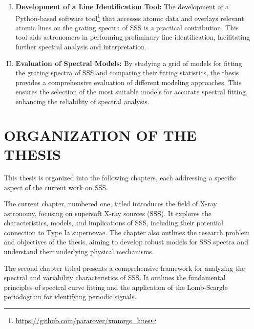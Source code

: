 \begin{enumerate}[I.]
    		\item \textbf{Development of a Line Identification Tool:} The development of a Python-based software tool\footnote{\url{https://github.com/pararover/xmmrgs_lines}} that accesses atomic data and overlays relevant atomic lines on the grating spectra of SSS is a practical contribution. This tool aids astronomers in performing preliminary line identification, facilitating further spectral analysis and interpretation.
    		
    		\item \textbf{Evaluation of Spectral Models:} By studying a grid of models for fitting the grating spectra of SSS and comparing their fitting statistics, the thesis provides a comprehensive evaluation of different modeling approaches. This ensures the selection of the most suitable models for accurate spectral fitting, enhancing the reliability of spectral analysis.
    	\end{enumerate}
    
    \section{\MakeUppercase{Organization of the Thesis}} \label{introduction:thesis_organization}
    	This thesis is organized into the following chapters, each addressing a specific aspect of the current work on SSS.
    	
    	The current chapter, numbered one, titled \textit{\ChapterTitleOne} introduces the field of X-ray astronomy, focusing on supersoft X-ray sources (SSS). It explores the characteristics, models, and implications of SSS, including their potential connection to Type Ia supernovae. The chapter also outlines the research problem and objectives of the thesis, aiming to develop robust models for SSS spectra and understand their underlying physical mechanisms.
    	
    	The second chapter titled \textit{\ChapterTitleTwo} presents a comprehensive framework for analyzing the spectral and variability characteristics of SSS. It outlines the fundamental principles of spectral curve fitting and the application of the Lomb-Scargle periodogram for identifying periodic signals.
    	
